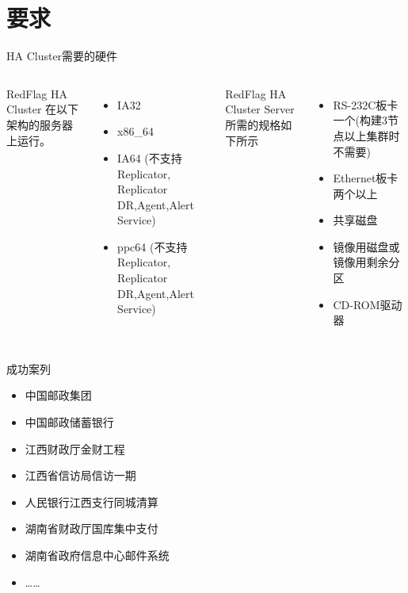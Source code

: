 \documentclass[compress,trans]{beamer} %
\begin{document}
\section{要求}
\begin{frame}{HA Cluster需要的硬件}
\begin{columns}[t]
   RedFlag HA Cluster 在以下架构的服务器上运行。
   \begin{itemize}
     \item        IA32
     \item        x86\_64
     \item        IA64   (不支持Replicator, Replicator DR,Agent,Alert Service)
     \item        ppc64  (不支持Replicator, Replicator DR,Agent,Alert Service)
   \end{itemize}
   RedFlag HA Cluster Server 所需的规格如下所示
   \begin{itemize}
     \item RS-232C板卡 一个(构建3节点以上集群时不需要)
     \item Ethernet板卡两个以上
     \item 共享磁盘
     \item 镜像用磁盘或镜像用剩余分区
     \item CD-ROM驱动器
   \end{itemize}
      
\end{columns}
\end{frame}

\begin{frame}{成功案列}
\begin{itemize}
  \item 中国邮政集团
  \item 中国邮政储蓄银行
  \item 江西财政厅金财工程
  \item 江西省信访局信访一期
  \item 人民银行江西支行同城清算
  \item 湖南省财政厅国库集中支付
  \item 湖南省政府信息中心邮件系统
  \item \ldots \ldots
\end{itemize}
\end{frame}
\end{document}
